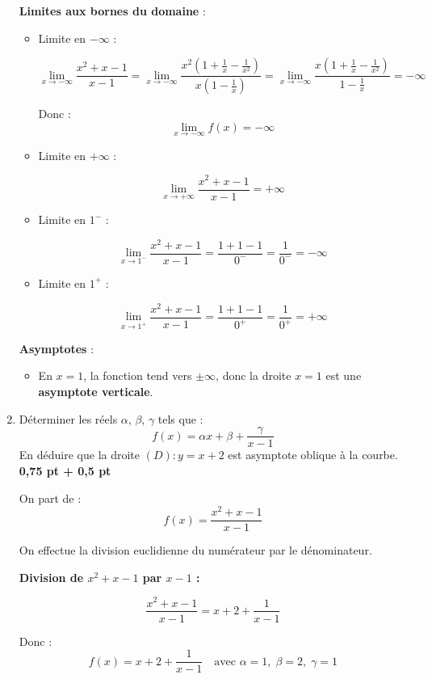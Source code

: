 \documentclass[12pt,a4paper]{article}
\begin{document}
\begin{enumerate}
\textbf{Limites aux bornes du domaine} :

\begin{itemize}
    \item Limite en \( -\infty \) :

    \[
    \lim_{x \to -\infty} \frac{x^2 + x - 1}{x - 1} = \lim_{x \to -\infty} \frac{x^2(1 + \frac{1}{x} - \frac{1}{x^2})}{x(1 - \frac{1}{x})}
    = \lim_{x \to -\infty} \frac{x(1 + \frac{1}{x} - \frac{1}{x^2})}{1 - \frac{1}{x}} = -\infty
    \]

    Donc :
    \[
    \lim_{x \to -\infty} f(x) = -\infty
    \]

    \item Limite en \( +\infty \) :

    \[
    \lim_{x \to +\infty} \frac{x^2 + x - 1}{x - 1} = +\infty
    \]

    \item Limite en \( 1^- \) :

    \[
    \lim_{x \to 1^-} \frac{x^2 + x - 1}{x - 1} = \frac{1 + 1 - 1}{0^-} = \frac{1}{0^-} = -\infty
    \]

    \item Limite en \( 1^+ \) :

    \[
    \lim_{x \to 1^+} \frac{x^2 + x - 1}{x - 1} = \frac{1 + 1 - 1}{0^+} = \frac{1}{0^+} = +\infty
    \]
\end{itemize}

\textbf{Asymptotes} :
\begin{itemize}
    \item En \( x = 1 \), la fonction tend vers \( \pm\infty \), donc la droite \( x = 1 \) est une \textbf{asymptote verticale}.
\end{itemize}

    
\item Déterminer les réels \( \alpha \), \( \beta \), \( \gamma \) tels que :
\[
f(x) = \alpha x + \beta + \frac{\gamma}{x - 1}
\]
En déduire que la droite \( (D) : y = x + 2 \) est asymptote oblique à la courbe. \hfill \textbf{0{,}75 pt + 0{,}5 pt}

On part de :
\[
f(x) = \frac{x^2 + x - 1}{x - 1}
\]

On effectue la division euclidienne du numérateur par le dénominateur.

\textbf{Division de \( x^2 + x - 1 \) par \( x - 1 \) :}

\[
\frac{x^2 + x - 1}{x - 1} = x + 2 + \frac{1}{x - 1}
\]

Donc :
\[
\boxed{f(x) = x + 2 + \frac{1}{x - 1}} \quad \text{avec } \alpha = 1,\; \beta = 2,\; \gamma = 1
\]


\end{enumerate}
\end{document}

